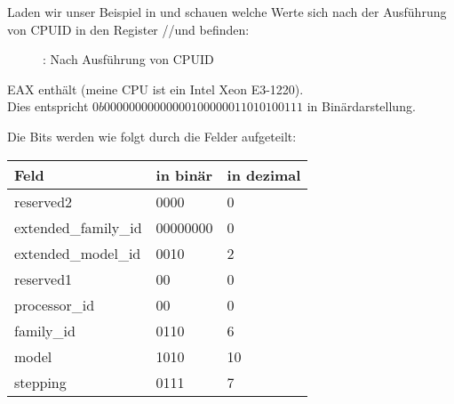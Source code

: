 \clearpage
{}
\myindex{\olly}

Laden wir unser Beispiel in \olly 
und schauen welche Werte sich nach der Ausführung von CPUID in den Register \EAX/\EBX/\ECX und \EDX befinden:

\begin{figure}[H]
\centering
{}
\caption{\olly: Nach Ausführung von CPUID}
\label{fig:cpuid_olly_1}
\end{figure}

EAX enthält  (meine \ac{CPU} ist ein Intel Xeon E3-1220).\\
Dies entspricht $0b0000 0000 0000 0010 0000 0110 1010 0111$ in Binärdarstellung.

Die Bits werden wie folgt durch die Felder aufgeteilt:

\begin{center}
\begin{tabular}{ | l | l | l | }
\hline
\headercolor{} Feld &
\headercolor{} in binär &
\headercolor{} in dezimal \\
\hline
reserved2		& 0000 & 0 \\
\hline
extended\_family\_id	& 00000000 & 0 \\
\hline
extended\_model\_id	& 0010 & 2 \\
\hline
reserved1		& 00 & 0 \\
\hline
processor\_id		& 00 & 0 \\
\hline
family\_id		& 0110 & 6 \\
\hline
model			& 1010 & 10 \\
\hline
stepping		& 0111 & 7 \\
\hline
\end{tabular}
\end{center}


